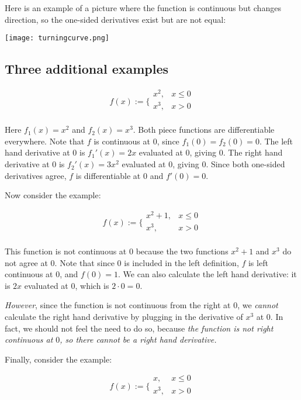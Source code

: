 \documentclass[10pt]{amsart}
\begin{document}
Here is an example of a picture where the function is continuous but
changes direction, so the one-sided derivatives exist but are not equal:

\texttt{[image: turningcurve.png]}
\subsection{Three additional examples}

$$f(x) := \lbrace\begin{array}{rl} x^2, & x \le 0\\ x^3, & x > 0 \\\end{array}$$

Here $f_1(x) = x^2$ and $f_2(x) = x^3$. Both piece functions are
differentiable everywhere. Note that $f$ is continuous at $0$, since
$f_1(0) = f_2(0) = 0$. The left hand derivative at $0$ is $f_1'(x)
=2x$ evaluated at $0$, giving $0$. The right hand derivative at $0$ is
$f_2'(x) = 3x^2$ evaluated at $0$, giving $0$. Since both one-sided
derivatives agree, $f$ is differentiable at $0$ and $f'(0) = 0$.

Now consider the example:

$$f(x) := \lbrace\begin{array}{rl} x^2 + 1, & x \le 0\\ x^3, & x > 0 \\\end{array}$$

This function is not continuous at $0$ because the two functions $x^2
+ 1$ and $x^3$ do not agree at $0$. Note that since $0$ is included in
the left definition, $f$ is left continuous at $0$, and $f(0) = 1$. We
can also calculate the left hand derivative: it is $2x$ evaluated at
$0$, which is $2 \cdot 0 = 0$.

{\em However}, since the function is not continuous from the right at
$0$, we {\em cannot} calculate the right hand derivative by plugging
in the derivative of $x^3$ at $0$. In fact, we should not feel the
need to do so, because {\em the function is not right continuous at
$0$, so there cannot be a right hand derivative.}

Finally, consider the example:

$$f(x) := \lbrace\begin{array}{rl} x, & x \le 0\\ x^3, &x > 0 \\\end{array}$$
\end{document}
